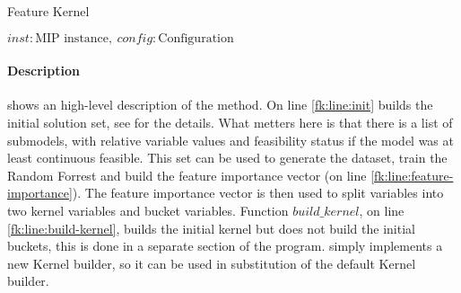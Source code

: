 \begin{algorithm}[H]
    \caption{Feature Kernel}\label{algo:feature-kernel}
    \begin{algorithmic}[1]
        \REQUIRE $inst: \text{MIP instance},\ config: \text{Configuration}$
         \label{fk:line:init}
         \label{fk:line:feature-importance}
         \label{fk:line:build-kernel}
    \end{algorithmic}
\end{algorithm}

\paragraph{Description}  shows an high-level description of the method. On line \ref{fk:line:init} 
 builds the initial solution set, see  for the details. What metters here is
that there is a list of submodels, with relative variable values and feasibility status if the model was at least continuous feasible. This 
set can be used to generate the dataset, train the Random Forrest and build the feature importance vector (on line \ref{fk:line:feature-importance}).
The feature importance vector is then used to split variables into two kernel variables and bucket variables. Function $build\_kernel$, on line \ref{fk:line:build-kernel},
builds the initial kernel but does not build the initial buckets, this is done in a separate section of the program.  simply implements a 
new Kernel builder, so it can be used in substitution of the default Kernel builder.



